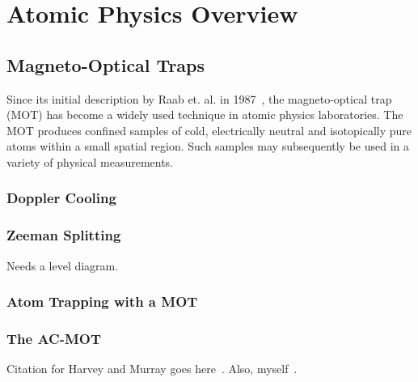 %
%
%
\clearpage
\chapter{Atomic Physics Overview}
\label{atomicphysics_chapter}
\section{Magneto-Optical Traps}
Since its initial description by Raab et. al. in 1987~\cite{raabprentiss}, the magneto-optical trap (MOT) has become a widely used technique in atomic physics laboratories.  The MOT produces confined samples of cold, electrically neutral and isotopically pure atoms within a small spatial region.  Such samples may subsequently be used in a variety of physical measurements.


	\subsection{Doppler Cooling}
	\subsection{Zeeman Splitting}
	Needs a level diagram.
	\subsection{Atom Trapping with a MOT}
	\subsection{The AC-MOT}
	Citation for Harvey and Murray goes here~\cite{harveymurray}.  Also, myself~\cite{thesis}.

